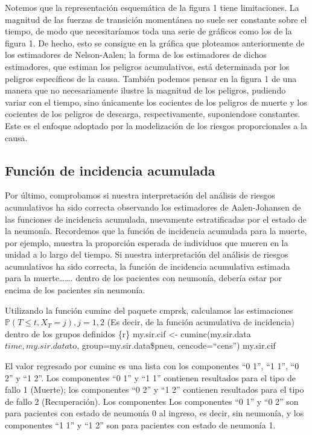 \documentclass[
]{article}
\begin{document}
Notemos que la representación esquemática de la figura 1 tiene
limitaciones. La magnitud de las fuerzas de transición momentánea no
suele ser constante sobre el tiempo, de modo que necesitaríamos toda una
serie de gráficos como los de la figura 1. De hecho, esto se consigue en
la gráfica que ploteamos anteriormente de los estimadores de
Nelson-Aalen; la forma de los estimadores de dichos estimadores, que
estiman los peligros acumulativos, está determinada por los peligros
específicos de la causa. También podemos pensar en la figura 1 de una
manera que no necesariamente ilustre la magnitud de los peligros,
pudiendo variar con el tiempo, sino únicamente los cocientes de los
peligros de muerte y los cocientes de los peligros de descarga,
respectivamente, suponiendose constantes. Este es el enfoque adoptado
por la modelización de los riesgos proporcionales a la causa.

\hypertarget{funciuxf3n-de-incidencia-acumulada}{%
\subsection{Función de incidencia
acumulada}\label{funciuxf3n-de-incidencia-acumulada}}

Por último, comprobamos si nuestra interpretación del análisis de
riesgos acumulativos ha sido correcta observando los estimadores de
Aalen-Johansen de las funciones de incidencia acumulada, nuevamente
estratificadas por el estado de la neumonía. Recordemos que la función
de incidencia acumulada para la muerte, por ejemplo, muestra la
proporción esperada de individuos que mueren en la unidad a lo largo del
tiempo. Si nuestra interpretación del análisis de riesgos acumulativos
ha sido correcta, la función de incidencia acumulativa estimada para la
muerte\ldots\ldots. dentro de los pacientes con neumonía, debería estar
por encima de los pacientes sin neumonía.

Utilizando la función cuminc del paquete cmprsk, calculamos las
estimaciones \(\mathbb{P}( T \leq t, X_{T} = j), j = 1, 2\) (Es decir,
de la función acumulativa de incidencia) dentro de los grupos definidos
\{r\} my.sir.cif \textless- cuminc(my.sir.data\(time, my.sir.data\)to,
group=my.sir.data\$pneu, cencode=``cens'') my.sir.cif

El valor regresado por cuminc es una lista con los componentes ``0 1'',
``1 1'', ``0 2'' y ``1 2''. Los componentes ``0 1'' y ``1 1'' contienen
resultados para el tipo de fallo 1 (Muerte); los componentes ``0 2'' y
``1 2'' contienen resultados para el tipo de fallo 2 (Recuperación). Los
componentes Los componentes ``0 1'' y ``0 2'' son para pacientes con
estado de neumonía 0 al ingreso, es decir, sin neumonía, y los
componentes ``1 1'' y ``1 2'' son para pacientes con estado de neumonía
1.
\end{document}

